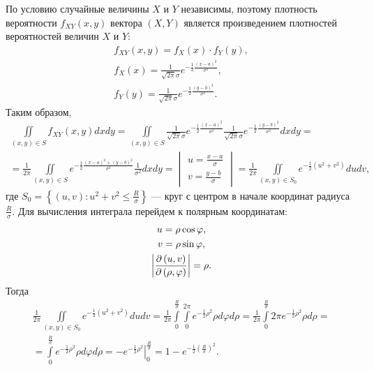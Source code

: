По условию случайные величины $X$ и $Y$ независимы, поэтому плотность вероятности $f_{XY}(x,y)$ вектора $\left ( X, Y \right )$ является произведением плотностей вероятностей
величин $X$ и $Y$:
\begin{gather}
    f_{XY}(x,y) = f_X(x) \cdot f_Y(y) , \\
    f_X(x) = \frac{1}{\sqrt{2 \pi} \sigma} e^{- \frac{1}{2} \frac{\left ( x - a \right )^2}{\sigma^2}} , \\
    f_Y(y) = \frac{1}{\sqrt{2 \pi} \sigma} e^{- \frac{1}{2} \frac{\left ( y - b \right )^2}{\sigma^2}} .
\end{gather}
Таким образом,
\begin{multline}
    \iint \limits_{(x,y) \in S} f_{XY}(x,y) dx dy
    = \iint \limits_{(x,y) \in S} \frac{1}{\sqrt{2 \pi} \sigma} e^{- \frac{1}{2} \frac{\left ( x - a \right )^2}{\sigma^2}} \frac{1}{\sqrt{2 \pi} \sigma} e^{- \frac{1}{2} \frac{\left ( y - b \right )^2}{\sigma^2}} dx dy = \\
    = \frac{1}{2 \pi} \iint \limits_{(x,y) \in S}  e^{- \frac{1}{2} \frac{\left ( x - a \right )^2 + \left ( y - b \right )^2}{\sigma^2}} \frac{1}{\sigma^2} dx dy
    = \begin{vmatrix}
          u = \frac{x - a}{\sigma} \\
          v = \frac{y - b}{\sigma}
    \end{vmatrix}
    = \frac{1}{2 \pi} \iint \limits_{(x,y) \in S_0}  e^{- \frac{1}{2} \left ( u^2 + v^2 \right )} du dv ,
\end{multline}
где $S_0 = \left \{ (u,v) : u^2 + v^2 \le \frac{R}{\sigma} \right \}$ --- круг с центром в начале координат радиуса $\frac{R}{\sigma}$. Для вычисления интеграла перейдем к
полярным координатам:
\begin{gather}
    u = \rho \cos \varphi, \\
    v = \rho \sin \varphi, \\
    \left | \frac{\partial \left ( {u, v} \right )}{\partial \left ( {\rho, \varphi} \right )} \right | = \rho.
\end{gather}
Тогда
\begin{multline}
    \frac{1}{2 \pi} \iint \limits_{(x,y) \in S_0}  e^{- \frac{1}{2} \left ( u^2 + v^2 \right )} du dv
    = \frac{1}{2 \pi} \int \limits_0^\frac{R}{\sigma} \int \limits_0^{2 \pi} e^{- \frac{1}{2} \rho^2} \rho d \varphi d \rho
    = \frac{1}{2 \pi} \int \limits_0^\frac{R}{\sigma} 2 \pi e^{- \frac{1}{2} \rho^2} \rho d \rho = \\
    = \int \limits_0^\frac{R}{\sigma} e^{- \frac{1}{2} \rho^2} \rho d \varphi d \rho
    = \left . - e^{-\frac{1}{2} \rho^2} \right |_0^{\frac{R}{\sigma}}
    = 1 - e^{-\frac{1}{2} \left ( \frac{R}{\sigma} \right )^2} .
\end{multline}
